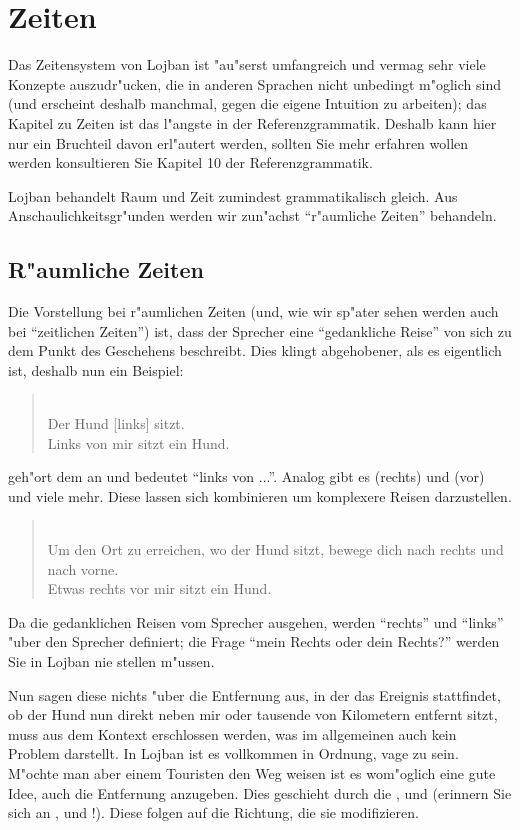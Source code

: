 \section{Zeiten}
Das Zeitensystem von Lojban ist "au"serst umfangreich und vermag sehr viele Konzepte auszudr"ucken, die in anderen Sprachen nicht unbedingt
m"oglich sind (und erscheint deshalb manchmal, gegen die eigene Intuition zu arbeiten); das Kapitel zu Zeiten ist das l"angste in der
Referenzgrammatik. Deshalb kann hier nur ein Bruchteil davon erl"autert werden, sollten Sie mehr erfahren wollen werden konsultieren Sie Kapitel
10 der Referenzgrammatik.

Lojban behandelt Raum und Zeit zumindest grammatikalisch gleich. Aus Anschaulichkeitsgr"unden werden wir zun"achst ``r"aumliche Zeiten'' behandeln.

\subsection{R"aumliche Zeiten}
Die Vorstellung bei r"aumlichen Zeiten (und, wie wir sp"ater sehen werden auch bei ``zeitlichen Zeiten'') ist, dass der Sprecher eine ``gedankliche Reise'' von sich zu dem Punkt des Geschehens beschreibt.
Dies klingt abgehobener, als es eigentlich ist, deshalb nun ein Beispiel:
\begin{quote}
 \\
Der Hund [links] sitzt.\\
Links von mir sitzt ein Hund.
\end{quote}

 geh"ort dem  an und bedeutet ``links von ...''. Analog gibt es  (rechts) und  (vor) und viele mehr.
Diese  lassen sich kombinieren um komplexere Reisen darzustellen.
\begin{quote}
 \\
Um den Ort zu erreichen, wo der Hund sitzt, bewege dich nach rechts und nach vorne. \\
Etwas rechts vor mir sitzt ein Hund.
\end{quote}
Da die gedanklichen Reisen vom Sprecher ausgehen, werden ``rechts'' und ``links'' "uber den Sprecher definiert; die Frage ``mein Rechts oder dein Rechts?'' werden Sie in Lojban nie stellen m"ussen.

Nun sagen diese  nichts "uber die Entfernung aus, in der das Ereignis stattfindet, ob der Hund nun direkt neben mir oder tausende von
Kilometern entfernt sitzt, muss aus dem Kontext erschlossen werden, was im allgemeinen auch kein Problem darstellt. In Lojban ist es vollkommen
in Ordnung, vage zu sein. M"ochte man aber einem Touristen den Weg weisen ist es wom"oglich eine gute Idee, auch die Entfernung anzugeben.
Dies geschieht durch die  ,  und  (erinnern Sie sich an ,  und !). Diese  folgen auf die Richtung, die sie modifizieren.

